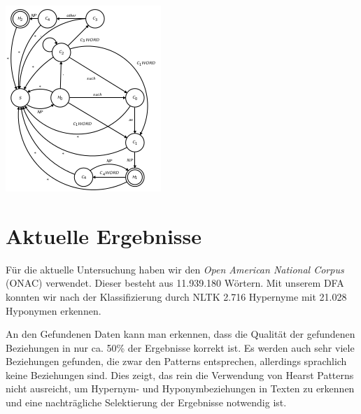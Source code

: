 \begin{centering}
  \includegraphics[scale=0.75]{img/hpdfa}
\end{centering}

\section{Aktuelle Ergebnisse}

Für die aktuelle Untersuchung haben wir den \textit{Open American
National Corpus} (ONAC) verwendet. Dieser besteht aus 11.939.180 
Wörtern. Mit unserem DFA konnten wir nach der Klassifizierung durch
NLTK 2.716 Hypernyme mit 21.028 Hyponymen erkennen.

An den Gefundenen Daten kann man erkennen, dass die Qualität der
gefundenen Beziehungen in nur ca. 50\% der Ergebnisse korrekt ist. Es
werden auch sehr viele Beziehungen gefunden, die zwar den Patterns
entsprechen, allerdings sprachlich keine Beziehungen sind. Dies zeigt,
das rein die Verwendung von Hearst Patterns nicht ausreicht, um
Hypernym- und Hyponymbeziehungen in Texten zu erkennen und eine
nachträgliche Selektierung der Ergebnisse notwendig ist.
